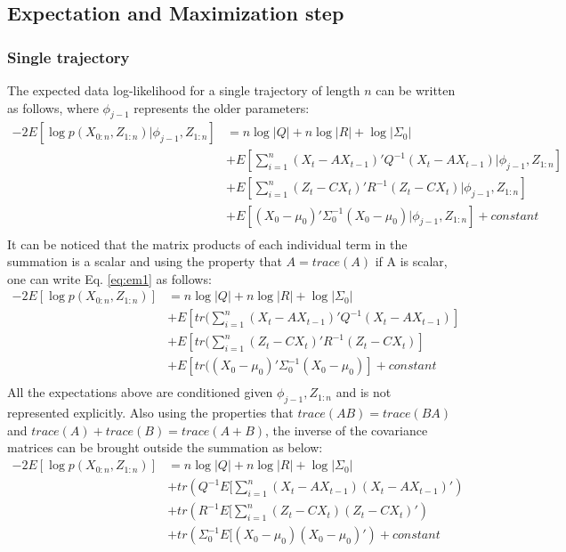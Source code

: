 \documentclass{article}
\begin{document}
\subsection{Expectation and Maximization step}\label{ssec:EM_Theory}
\subsubsection{Single trajectory}
 The expected data log-likelihood for a single trajectory of length $n$ can be written as follows, where $\phi_{j-1}$ represents the older parameters:
\begin{equation}\label{eq:em1}
\begin{split}
     -2E[\log p(X_{0:n},Z_{1:n})|\phi_{j-1},Z_{1:n}] &=n\log |Q|+n\log|R| + \log|\Sigma_0|\\
     &+ E[\sum_{i=1}^n(X_t-AX_{t-1})'Q^{-1}(X_t-AX_{t-1}) |\phi_{j-1},Z_{1:n}] \\ 
 &+ E[\sum_{i=1}^n(Z_t-CX_t)'R^{-1}(Z_t-CX_t)|\phi_{j-1},Z_{1:n}]\\
 &+ E[(X_0-\mu_0)'\Sigma_0^{-1}(X_0-\mu_0)|\phi_{j-1},Z_{1:n}] +constant\\
\end{split}
\end{equation}
It can be noticed that the matrix products of each individual term in the summation is a scalar and using the property that $A=trace(A)$ if A is scalar, one can write Eq.  \ref{eq:em1} as follows:
\begin{equation}
\begin{split}
     -2E[\log p(X_{0:n},Z_{1:n})] &=n\log |Q|+n\log|R| + \log|\Sigma_0|\\
     &+ E[tr(\sum_{i=1}^n(X_t-AX_{t-1})'Q^{-1}(X_t-AX_{t-1})] \\ 
 &+ E[tr(\sum_{i=1}^n(Z_t-CX_t)'R^{-1}(Z_t-CX_t)]\\
 &+ E[tr((X_0-\mu_0)'\Sigma_0^{-1}(X_0-\mu_0)] +constant\\
\end{split}
\end{equation}
All the expectations above are conditioned given $\phi_{j-1},Z_{1:n}$ and is not represented explicitly. Also using the properties that $trace(AB)=trace(BA)$ and $trace(A)+trace(B)=trace(A+B)$, the inverse of the covariance matrices can be brought outside the summation as below:
\begin{equation}
\begin{split}
     -2E[\log p(X_{0:n},Z_{1:n})] &=n\log |Q|+n\log|R| + \log|\Sigma_0|\\
     &+ tr(Q^{-1}E[\sum_{i=1}^n(X_t-AX_{t-1})(X_t-AX_{t-1})') \\ 
 &+ tr(R^{-1}E[\sum_{i=1}^n(Z_t-CX_t)(Z_t-CX_t)')\\
 &+ tr(\Sigma_0^{-1}E[(X_0-\mu_0)(X_0-\mu_0)') +constant\\
\end{split}
\end{equation}
\end{document}

